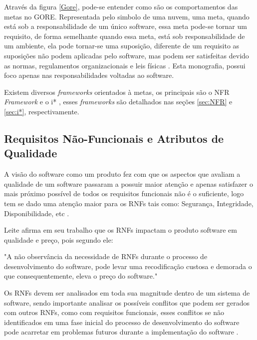  Através da figura \ref{Gore}, pode-se entender como são os comportamentos das metas no GORE. Representada pelo simbolo de uma nuvem, uma meta, quando está sob a responsabilidade de um único software, essa meta pode-se tornar um requisito, de forma semelhante quando essa meta, está sob responsabilidade de um ambiente, ela pode tornar-se uma suposição, diferente de um requisito as suposições não podem aplicadas pelo software, mas podem ser satisfeitas devido as normas, regulamentos organizacionais e leis físicas \cite{van2001goal}. Esta monografia, possui foco apenas nas responsabilidades voltadas ao software.


Existem diversos \textit{frameworks} orientados à metas, os principais  são o NFR \textit{Framework} \cite{chung2012non} e o i* \cite{istarwiki20}, esses \textit{frameworks} são detalhados nas seções \ref{sec:NFR} e \ref{sec:i*}, respectivamente.

\subsection{Requisitos Não-Funcionais e Atributos de Qualidade}
\label{subsec:requisitosNaoFuncionais}

A visão do software como um produto fez com que os aspectos que avaliam a qualidade de um software passaram a possuir maior atenção e apenas satisfazer o mais próximo possível de todos os requisitos funcionais não é o suficiente, logo tem se dado uma atenção maior para os RNFs tais como: Segurança, Integridade, Disponibilidade, etc \cite{cysneiros1997definindo}.


Leite afirma em seu trabalho que os RNFs impactam o produto software em qualidade e preço, pois segundo ele:

\begin{citacao}
	"A não observância da necessidade de RNFs durante o processo de desenvolvimento do software, pode levar uma recodificação custosa e demorada o que consequentemente, eleva o preço do software." \cite[p. 2]{cysneiros1997definindo}
\end{citacao}

Os RNFs devem ser analisados em toda sua magnitude dentro de um sistema de software, sendo importante analisar os possíveis conflitos que podem ser gerados com outros RNFs, como com requisitos funcionais, esses conflitos se não identificados em uma fase inicial do processo de desenvolvimento do software pode acarretar em problemas futuros durante a implementação do software \cite{cysneiros1997definindo}. 


